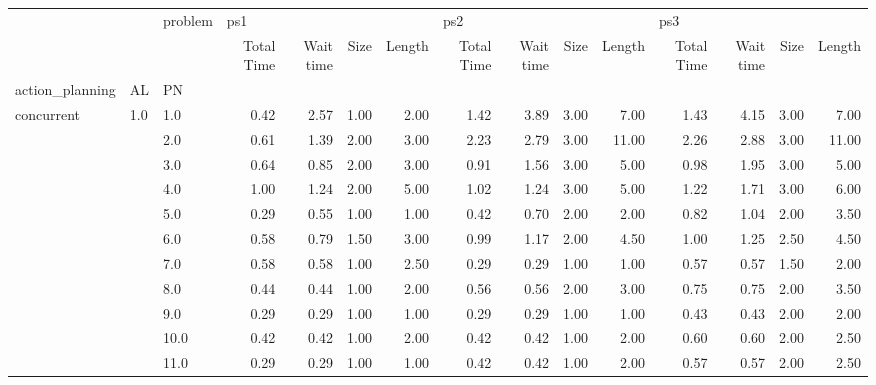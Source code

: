 \begin{tabular}{lllrrrrrrrrrrrr}
\toprule
           &     & problem & \multicolumn{4}{l}{ps1} & \multicolumn{4}{l}{ps2} & \multicolumn{4}{l}{ps3} \\
           &     & {} & Total Time & Wait time & Size & Length & Total Time & Wait time & Size & Length & Total Time & Wait time & Size & Length \\
action\_planning & AL & PN &            &           &      &        &            &           &      &        &            &           &      &        \\
\midrule
concurrent & 1.0 & 1.0  &       0.42 &      2.57 & 1.00 &   2.00 &       1.42 &      3.89 & 3.00 &   7.00 &       1.43 &      4.15 & 3.00 &   7.00 \\
           &     & 2.0  &       0.61 &      1.39 & 2.00 &   3.00 &       2.23 &      2.79 & 3.00 &  11.00 &       2.26 &      2.88 & 3.00 &  11.00 \\
           &     & 3.0  &       0.64 &      0.85 & 2.00 &   3.00 &       0.91 &      1.56 & 3.00 &   5.00 &       0.98 &      1.95 & 3.00 &   5.00 \\
           &     & 4.0  &       1.00 &      1.24 & 2.00 &   5.00 &       1.02 &      1.24 & 3.00 &   5.00 &       1.22 &      1.71 & 3.00 &   6.00 \\
           &     & 5.0  &       0.29 &      0.55 & 1.00 &   1.00 &       0.42 &      0.70 & 2.00 &   2.00 &       0.82 &      1.04 & 2.00 &   3.50 \\
           &     & 6.0  &       0.58 &      0.79 & 1.50 &   3.00 &       0.99 &      1.17 & 2.00 &   4.50 &       1.00 &      1.25 & 2.50 &   4.50 \\
           &     & 7.0  &       0.58 &      0.58 & 1.00 &   2.50 &       0.29 &      0.29 & 1.00 &   1.00 &       0.57 &      0.57 & 1.50 &   2.00 \\
           &     & 8.0  &       0.44 &      0.44 & 1.00 &   2.00 &       0.56 &      0.56 & 2.00 &   3.00 &       0.75 &      0.75 & 2.00 &   3.50 \\
           &     & 9.0  &       0.29 &      0.29 & 1.00 &   1.00 &       0.29 &      0.29 & 1.00 &   1.00 &       0.43 &      0.43 & 2.00 &   2.00 \\
           &     & 10.0 &       0.42 &      0.42 & 1.00 &   2.00 &       0.42 &      0.42 & 1.00 &   2.00 &       0.60 &      0.60 & 2.00 &   2.50 \\
           &     & 11.0 &       0.29 &      0.29 & 1.00 &   1.00 &       0.42 &      0.42 & 1.00 &   2.00 &       0.57 &      0.57 & 2.00 &   2.50 \\

\end{tabular}
